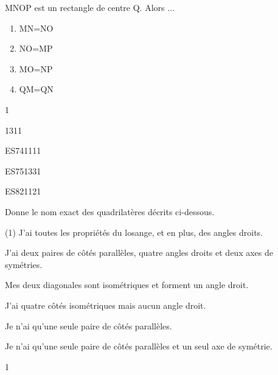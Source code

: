 \documentclass[a4paper,11pt]{report}
\begin{document}
\begin{exo}
{\begin{tasks}
        \task MNOP est un rectangle de centre Q.  Alors $\ldots$
        {\setlength\columnsep{-10pt}
        \begin{multicols}{4}
        \begin{enumerate}[label=$\square$]
            \item MN=NO
            \item NO=MP
            \item MO=NP
            \item QM=QN
        \end{enumerate}
        \end{multicols}}
\end{tasks}
}{1}
\end{exo}

\begin{QSJ}{131}{1}
\end{QSJ}
\begin{exol}{ES74}{111}{1}
\end{exol}
\begin{exof}{ES75}{133}{1}
\end{exof}
\begin{exol}{ES82}{112}{1}
\end{exol}

						\begin{exo}{
    Donne le nom exact des quadrilatères décrits ci-dessous.

    \begin{tasks}(1)
        \task J'ai toutes les propriétés du losange, et en plus, des angles droits. %

        \task J'ai deux paires de côtés parallèles, quatre angles droits et deux axes de symétries. %

        \task Mes deux diagonales sont isométriques et forment un angle droit. %

        \task J'ai quatre côtés isométriques mais aucun angle droit. %

        \task Je n'ai qu'une seule paire de côtés parallèles. %

        \task Je n'ai qu'une seule paire de côtés parallèles et un seul axe de symétrie. %
    \end{tasks}
}{1}
\end{exo}
\end{document}
